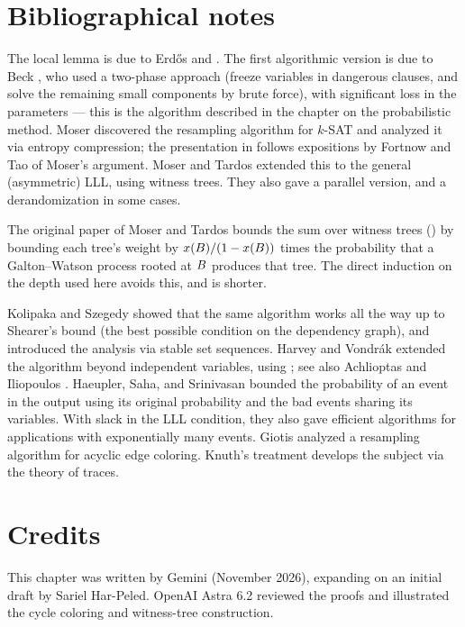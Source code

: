 \section{Bibliographical notes}

The local lemma is due to Erd\H{o}s and \Lovasz \cite{el-prthr-75}.
The first algorithmic version is due to Beck \cite{b-aallll-91}, who
used a two-phase approach (freeze variables in dangerous clauses, and solve the
remaining small components by brute force), with significant loss in
the parameters --- this is the algorithm described in the chapter on
the probabilistic method. Moser \cite{m-cplll-09} discovered the
resampling algorithm for $k$-SAT and analyzed it via entropy
compression; the presentation in  follows
expositions by Fortnow and Tao of Moser's argument. Moser and Tardos
\cite{mt-cpgll-10} extended this to the general (asymmetric) LLL,
using witness trees. They also gave a parallel version, and a
derandomization in some cases.

The original paper of Moser and Tardos bounds the sum over witness
trees () by bounding each tree's weight by
$x({B})/(1-x({B}))$ times the probability that a Galton--Watson
process rooted at ${B}$ produces that tree. The
direct induction on the depth used here avoids this, and is shorter.

Kolipaka and Szegedy \cite{ks-mtml-11} showed that the same algorithm
works all the way up to Shearer's bound (the best possible condition
on the dependency graph), and introduced the analysis via stable set
sequences. Harvey and Vondr\'ak \cite{hv-aplll-20} extended the
algorithm beyond independent variables, using
; see also
Achlioptas and Iliopoulos \cite{ai-rwfpo-16}. Haeupler, Saha, and
Srinivasan \cite{hss-ncall-11} bounded the probability of an event
in the output using its original probability and the bad events
sharing its variables. With slack in the LLL condition, they also
gave efficient algorithms for applications with exponentially many events. Giotis \etal
\cite{gkpt-aeclll-17} analyzed a resampling algorithm for acyclic
edge coloring. Knuth's treatment
\cite{k-taocp4b-22} develops the subject via the theory of traces.


\section*{Credits}

This chapter was written by Gemini (November 2026), expanding on an
initial draft by Sariel Har-Peled. OpenAI Astra 6.2 reviewed the proofs
and illustrated the cycle coloring and witness-tree construction.


\ChapterEnd{}
